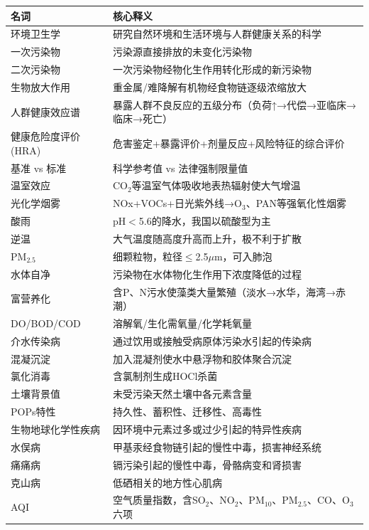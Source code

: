 \documentclass[10pt,a4paper,oneside]{ctexbook}
\begin{document}
\begin{table}[htbp]
\centering
\begin{tabularx}{\textwidth}{lX}
\hline
\textbf{名词} & \textbf{核心释义} \\
\hline
环境卫生学 & 研究自然环境和生活环境与人群健康关系的科学 \\
一次污染物 & 污染源直接排放的未变化污染物 \\
二次污染物 & 一次污染物经物化生作用转化形成的新污染物 \\
生物放大作用 & 重金属/难降解有机物经食物链逐级浓缩放大 \\
人群健康效应谱 & 暴露人群不良反应的五级分布（负荷↑→代偿→亚临床→临床→死亡） \\
健康危险度评价(HRA) & 危害鉴定+暴露评价+剂量反应+风险特征的综合评价 \\
基准 vs 标准 & 科学参考值 vs 法律强制限量值 \\
温室效应 & CO$_2$等温室气体吸收地表热辐射使大气增温 \\
光化学烟雾 & NOx+VOCs+日光紫外线→O$_3$、PAN等强氧化性烟雾 \\
酸雨 & pH$<$5.6的降水，我国以硫酸型为主 \\
逆温 & 大气温度随高度升高而上升，极不利于扩散 \\
PM$_{2.5}$ & 细颗粒物，粒径$\leq$2.5$\mu$m，可入肺泡 \\
水体自净 & 污染物在水体物化生作用下浓度降低的过程 \\
富营养化 & 含P、N污水使藻类大量繁殖（淡水→水华，海湾→赤潮） \\
DO/BOD/COD & 溶解氧/生化需氧量/化学耗氧量 \\
介水传染病 & 通过饮用或接触受病原体污染水引起的传染病 \\
混凝沉淀 & 加入混凝剂使水中悬浮物和胶体聚合沉淀 \\
氯化消毒 & 含氯制剂生成HOCl杀菌 \\
土壤背景值 & 未受污染天然土壤中各元素含量 \\
POPs特性 & 持久性、蓄积性、迁移性、高毒性 \\
生物地球化学性疾病 & 因环境中元素过多或过少引起的特异性疾病 \\
水俣病 & 甲基汞经食物链引起的慢性中毒，损害神经系统 \\
痛痛病 & 镉污染引起的慢性中毒，骨骼病变和肾损害 \\
克山病 & 低硒相关的地方性心肌病 \\
AQI & 空气质量指数，含SO$_2$、NO$_2$、PM$_{10}$、PM$_{2.5}$、CO、O$_3$六项 \\
\hline
\end{tabularx}
\end{table}
\end{document}
